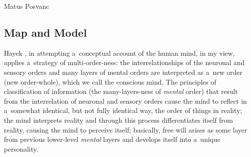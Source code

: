 \begin{artengenv}{Matus Posvanc}
\subsection*{Map and Model }



Hayek 
\parencite*[][]{Hayek1952Sensory}, %
 in attempting a~conceptual account of the human mind, in my view, applies a~strategy of multi-order-ness: the interrelationships of the neuronal and sensory orders and many layers of mental orders are interpreted as a~new order (new order-whole), which we call the conscious mind. The principles of classification of information (the many-layers-ness of \textit{mental} order) that result from the interrelation of neuronal and sensory orders cause the mind to reflect in a~somewhat identical, but not fully identical way, the order of things in reality; the mind interprets reality and through this process differentiates itself from reality, causing the mind to perceive itself; basically, free will arises as some layer from previous lower-level \textit{mental} layers and develops itself into a~unique personality.




\end{artengenv}
